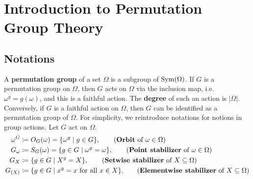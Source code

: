 \section{Introduction to Permutation Group Theory}
\subsection{Notations}
A \textbf{permutation group} of a set $\Omega$ is a subgroup of $\operatorname{Sym}(\Omega)$. If $G$ is a permutation group on $\Omega$, then $G$ acts on $\Omega$ via the inclusion map, i.e. $\omega^g = g(\omega)$, and this is a faithful action. The \textbf{degree} of such an action is $|\Omega|$.  Conversely, if $G$ is a faithful action on $\Omega$, then $G$ can be identified as a permutation group of $\Omega$. For simplicity, we reintroduce notations for notions in group actions. Let $G$ act on $\Omega$.  
\begin{align*}
	\omega^G &\coloneq O_G(\omega) =\{\omega^g\mid g\in G\}, \tag{\textbf{Orbit} of $\omega \in \Omega$}
	\\
	G_{\omega} &\coloneq  S_G(\omega) = \{g\in G\mid \omega^g = \omega\}, \tag{\textbf{Point stabilizer} of $\omega\in \Omega$}
	\\
	G_{X} &\coloneq   \{g\in G\mid X^g = X\}, \tag{\textbf{Setwise stabilizer} of $X\subseteq \Omega$}
	\\
	G_{(X)} &\coloneq   \{g\in G\mid x^g = x\text{ for all }x\in X\}. \tag{\textbf{Elementwise stabilizer} of $X\subseteq \Omega$}
\end{align*}
